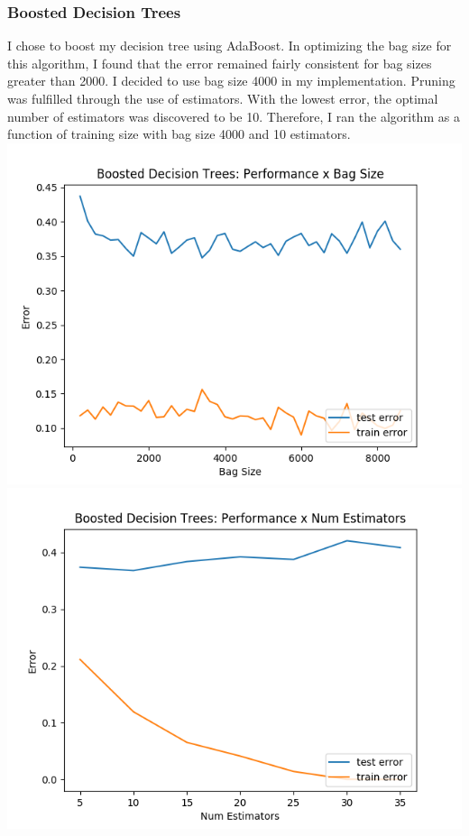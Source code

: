 \documentclass[11pt, a4paper]{article} %
\begin{document}
\subsubsection{Boosted Decision Trees}
I chose to boost my decision tree using AdaBoost. In optimizing the bag size for this algorithm, I found that the error remained fairly consistent for bag sizes greater than 2000. I decided to use bag size 4000 in my implementation. Pruning was fulfilled through the use of estimators. With the lowest error, the optimal number of estimators was discovered to be 10. Therefore, I ran the algorithm as a function of training size with bag size 4000 and 10 estimators.
\includegraphics[scale=0.525]{BoostedBS.png}
\includegraphics[scale=0.525]{BoostedNE2.png}
\end{document}
